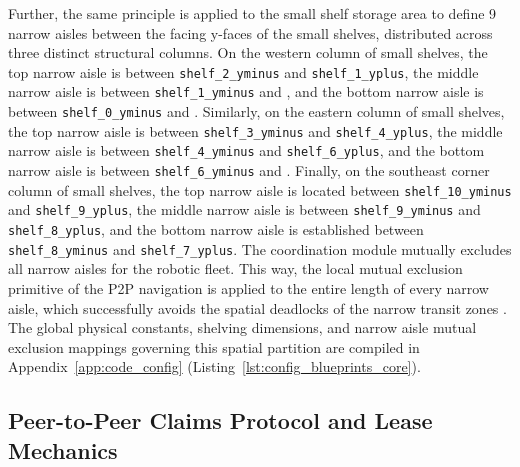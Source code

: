 Further, the same principle is applied to the small shelf storage area to define 9 narrow aisles between the facing y-faces of the small shelves, distributed across three distinct structural columns. On the western column of small shelves, the top narrow aisle is between \texttt{shelf\_2\_yminus} and \texttt{shelf\_1\_yplus}, the middle narrow aisle is between \texttt{shelf\_1\_yminus} and \texttt{}, and the bottom narrow aisle is between \texttt{shelf\_0\_yminus} and \texttt{}. Similarly, on the eastern column of small shelves, the top narrow aisle is between \texttt{shelf\_3\_yminus} and \texttt{shelf\_4\_yplus}, the middle narrow aisle is between \texttt{shelf\_4\_yminus} and \texttt{shelf\_6\_yplus}, and the bottom narrow aisle is between \texttt{shelf\_6\_yminus} and \texttt{}. Finally, on the southeast corner column of small shelves, the top narrow aisle is located between \texttt{shelf\_10\_yminus} and \texttt{shelf\_9\_yplus}, the middle narrow aisle is between \texttt{shelf\_9\_yminus} and \texttt{shelf\_8\_yplus}, and the bottom narrow aisle is established between \texttt{shelf\_8\_yminus} and \texttt{shelf\_7\_yplus}. The coordination module mutually excludes all narrow aisles for the robotic fleet. This way, the local mutual exclusion primitive of the P2P navigation is applied to the entire length of every narrow aisle, which successfully avoids the spatial deadlocks of the narrow transit zones \cite{ricart1981optimal}. The global physical constants, shelving dimensions, and narrow aisle mutual exclusion mappings governing this spatial partition are compiled in Appendix~\ref{app:code_config} (Listing~\ref{lst:config_blueprints_core}).

\subsection{Peer-to-Peer Claims Protocol and Lease Mechanics\label{sec:ch5_claims}}

